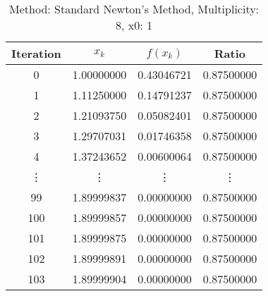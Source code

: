 \begin{table}
\centering
\caption{Method: Standard Newton's Method, Multiplicity: 8, x0: 1}
\label{tab:table_Standard_Newton's_Method_8_1}
\begin{tabular}{c c c c}
\toprule
Iteration &      $x_k$ &   $f(x_k)$ &      Ratio \\
\midrule
        0 & 1.00000000 & 0.43046721 & 0.87500000 \\
        1 & 1.11250000 & 0.14791237 & 0.87500000 \\
        2 & 1.21093750 & 0.05082401 & 0.87500000 \\
        3 & 1.29707031 & 0.01746358 & 0.87500000 \\
        4 & 1.37243652 & 0.00600064 & 0.87500000 \\
   \vdots &     \vdots &     \vdots &     \vdots \\
       99 & 1.89999837 & 0.00000000 & 0.87500000 \\
      100 & 1.89999857 & 0.00000000 & 0.87500000 \\
      101 & 1.89999875 & 0.00000000 & 0.87500000 \\
      102 & 1.89999891 & 0.00000000 & 0.87500000 \\
      103 & 1.89999904 & 0.00000000 & 0.87500000 \\
\bottomrule
\end{tabular}
\end{table}
